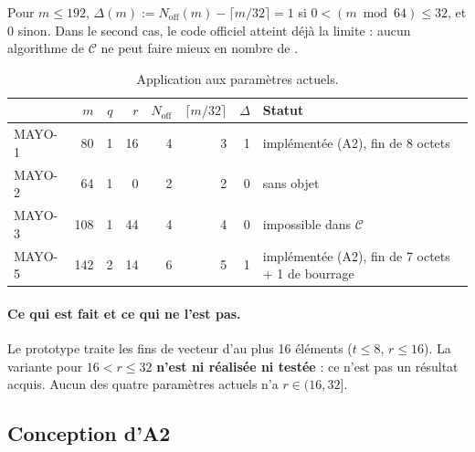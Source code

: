 \begin{corollaire}
Pour $m\le192$, $\Delta(m):=N_{\mathrm{off}}(m)-\lceil m/32\rceil=1$ si $0<(m\bmod64)\le32$, et $0$ sinon. Dans le second cas, le code officiel atteint déjà la limite : aucun algorithme de $\mathcal{C}$ ne peut faire mieux en nombre de \vpshufb{}.
\end{corollaire}

\begin{table}[ht]\centering\small
\caption{Application aux paramètres actuels.}\label{tab:delta}
\begin{tabular}{@{}lrrrrrrl@{}}\toprule
 & $m$ & $q$ & $r$ & $N_{\mathrm{off}}$ & $\lceil m/32\rceil$ & $\Delta$ & Statut\\\midrule
MAYO-1 & 80 & 1 & 16 & 4 & 3 & 1 & implémentée (A2), fin de 8 octets\\
MAYO-2 & 64 & 1 & 0 & 2 & 2 & 0 & sans objet\\
MAYO-3 & 108 & 1 & 44 & 4 & 4 & 0 & impossible dans $\mathcal{C}$\\
MAYO-5 & 142 & 2 & 14 & 6 & 5 & 1 & implémentée (A2), fin de 7 octets + 1 de bourrage\\\bottomrule
\end{tabular}
\end{table}

\paragraph{Ce qui est fait et ce qui ne l'est pas.} Le prototype traite les fins de vecteur d'au plus 16 éléments ($t\le8$, $r\le16$). La variante pour $16<r\le32$ \textbf{n'est ni réalisée ni testée} : ce n'est pas un résultat acquis. Aucun des quatre paramètres actuels n'a $r\in(16,32]$.

\subsection{Conception d'A2}
